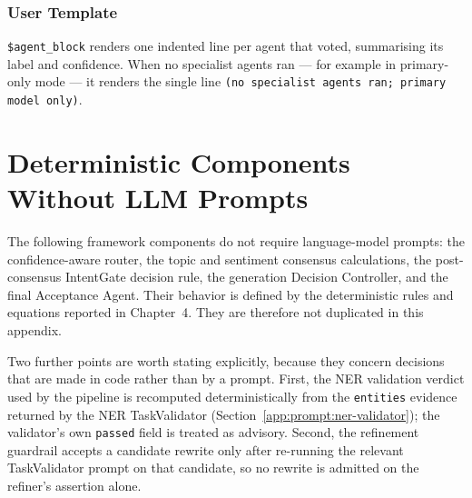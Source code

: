 \subsubsection{User Template}


\noindent
\texttt{\$agent\_block} renders one indented line per agent that voted,
summarising its label and confidence. When no specialist agents ran --- for
example in primary-only mode --- it renders the single line
\texttt{(no specialist agents ran; primary model only)}.


\section{Deterministic Components Without LLM Prompts}
\label{app:prompts:deterministic}

The following framework components do not require language-model prompts:
the confidence-aware router, the topic and sentiment consensus calculations,
the post-consensus IntentGate decision rule, the generation Decision
Controller, and the final Acceptance Agent. Their behavior is defined by the
deterministic rules and equations reported in Chapter~4. They are therefore not
duplicated in this appendix.

Two further points are worth stating explicitly, because they concern
decisions that are made in code rather than by a prompt. First, the NER
validation verdict used by the pipeline is recomputed deterministically from
the \texttt{entities} evidence returned by the NER TaskValidator
(Section~\ref{app:prompt:ner-validator}); the validator's own \texttt{passed}
field is treated as advisory. Second, the refinement guardrail accepts a
candidate rewrite only after re-running the relevant TaskValidator prompt on
that candidate, so no rewrite is admitted on the refiner's assertion alone.
